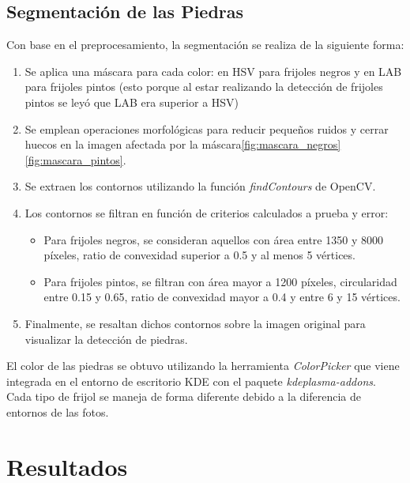 \documentclass[conference]{IEEEtran}
\begin{document}
    \subsection{Segmentación de las Piedras}
    Con base en el preprocesamiento, la segmentación se realiza de la siguiente forma:
    \begin{enumerate}
        \item Se aplica una máscara para cada color: en HSV para frijoles negros y en LAB para frijoles pintos (esto porque al estar realizando la detección de frijoles pintos se leyó\cite{lab} que LAB era superior a HSV)
        \item Se emplean operaciones morfológicas para reducir pequeños ruidos y cerrar huecos en la imagen afectada por la máscara\ref{fig:mascara_negros}\ref{fig:mascara_pintos}.
        \item Se extraen los contornos utilizando la función \textit{findContours} de OpenCV.
        \item Los contornos se filtran en función de criterios calculados a prueba y error:
        \begin{itemize}
            \item Para frijoles negros, se consideran aquellos con área entre 1350 y 8000 píxeles, ratio de convexidad superior a 0.5 y al menos 5 vértices.
            \item Para frijoles pintos, se filtran con área mayor a 1200 píxeles, circularidad entre 0.15 y 0.65, ratio de convexidad mayor a 0.4 y entre 6 y 15 vértices.
        \end{itemize}
        \item Finalmente, se resaltan dichos contornos sobre la imagen original para visualizar la detección de piedras.
    \end{enumerate}

    El color de las piedras se obtuvo utilizando la herramienta \textit{ColorPicker}\cite{colorpicker} que viene integrada en el entorno de escritorio KDE con el paquete \textit{kdeplasma-addons}. Cada tipo de frijol se maneja de forma diferente debido a la diferencia de entornos de las fotos.

    
\section{Resultados}
\end{document}

